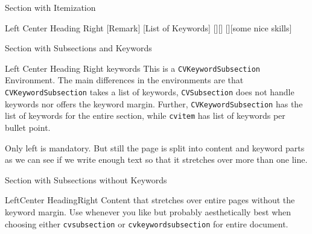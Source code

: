 \documentclass[a4paper]{mcdowellcv}
\begin{document}
	
    \makeheader
    
    \begin{cvsection}{Section with Itemization}
        \begin{cvitemize}
            {Left}
            {Center Heading}
            {Right}
                    [Remark]
                    [List of Keywords]
                [][]
                [][some nice skills]
        \end{cvitemize}
    \end{cvsection}

    \begin{cvsection}{Section with Subsections and Keywords}
        \begin{cvkeywordsubsection}
            {Left}
            {Center Heading}
            {Right}
            {keywords}
                 This is a \texttt{CVKeywordSubsection} Environment. 
                 The main differences in the environments are that \texttt{CVKeywordSubsection} takes a list of keywords, \texttt{CVSubsection} does not handle keywords nor offers the keyword margin.
                 Further, \texttt{CVKeywordSubsection} has the list of keywords for the entire section, while \texttt{cvitem} has list of keywords per bullet point.
        \end{cvkeywordsubsection}
        \begin{cvkeywordsubsection}
            {Only left is mandatory.}
            {}
            {}
            {}
            But still the page is split into content and keyword parts as we can see if we write enough text so that it stretches over more than one line. 
        \end{cvkeywordsubsection}
    \end{cvsection}

    \begin{cvsection}{Section with Subsections without Keywords}
        \begin{cvsubsection}{Left}{Center Heading}{Right}
            Content that stretches over entire pages without the keyword margin. Use whenever you like but probably aesthetically best when choosing either \texttt{cvsubsection} or \texttt{cvkeywordsubsection} for entire document.
            
        \end{cvsubsection}
                   
    \end{cvsection}
\end{document}
